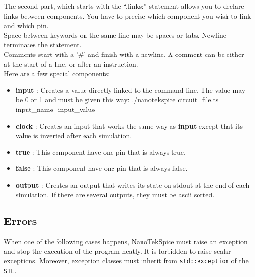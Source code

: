 \documentclass{koala-en}
\begin{document}
    The second part, which starts with the ``.links:'' statement allows you
    to declare links between components. You have to precise which component
    you wish to link and which pin.\\

    Space between keywords on the same line may be spaces or tabs. Newline
    terminates the statement.\\

    Comments start with a '\#' and finish with a newline. A comment can
    be either at the start of a line, or after an instruction.\\

    Here are a few special components:
    
  \begin{itemize}

    \item \textbf{input} : Creates a value directly linked to the command line.
      The value may be 0 or 1 and must be given this way:
      ./nanotekspice circuit\_file.ts input\_name=input\_value

    \item \textbf{clock} : Creates an input that works the same way as \textbf{input}
      except that its value is inverted after each simulation.

    \item \textbf{true} : This component have one pin that is always true.

    \item \textbf{false} : This component have one pin that is always false.
      
    \item \textbf{output} : Creates an output that writes its state on stdout at the end of
      each simulation. If there are several outputs, they must be
      ascii sorted.

  \end{itemize}

\subsection{Errors}

    When one of the following cases happens, NanoTekSpice must raise an 
  exception and stop the execution of the program neatly. It is forbidden
  to raise scalar exceptions. Moreover, exception classes must inherit from 
  \verb=std::exception= of the \texttt{STL}.
\end{document}
